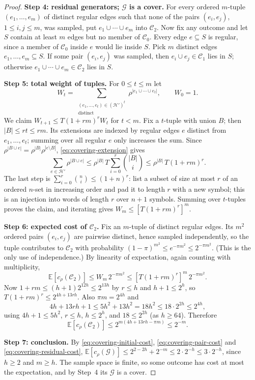 \documentclass[11pt,letterpaper]{article}
\theoremstyle{definition}
\theoremstyle{remark}
\numberwithin{equation}{section}
\newcommand{\step}[1]{\par\smallskip\noindent\textbf{#1}\enspace}
\begin{document}
\begin{proof}
\step{Step 4: residual generators; $\mathcal G$ is a cover.}
For every ordered $m$-tuple $(e_1,\ldots,e_m)$ of distinct regular edges
such that none of the pairs $(e_i,e_j)$, $1\le i,j\le m$, was sampled,
put $e_1\cup\cdots\cup e_m$ into $\mathcal C_2$. Now fix any outcome and
let $S$ contain at least $m$ edges but no member of $\mathcal C_0$.
Every edge $e\subseteq S$ is regular, since a member of $\mathcal C_0$
inside $e$ would lie inside $S$. Pick $m$ distinct edges
$e_1,\ldots,e_m\subseteq S$. If some pair $(e_i,e_j)$ was sampled, then
$e_i\cup e_j\in\mathcal C_1$ lies in $S$; otherwise
$e_1\cup\cdots\cup e_m\in\mathcal C_2$ lies in $S$.

\step{Step 5: total weight of tuples.}
For $0\le t\le m$ let
\[
W_t=
\sum_{\substack{(e_1,\ldots,e_t)\in(\mathcal H')^t\\ \text{distinct}}}
  \rho^{|e_1\cup\cdots\cup e_t|},
\qquad W_0=1.
\]
We claim $W_{t+1}\le T(1+rm)^rW_t$ for $t<m$. Fix a $t$-tuple with union
$B$; then $|B|\le rt\le rm$. Its extensions are indexed by regular edges
$e$ distinct from $e_1,\ldots,e_t$; summing over all regular $e$ only
increases the sum. Since
$\rho^{|B\cup e|}=\rho^{|B|}\rho^{|e\setminus B|}$,
\eqref{eq:covering-extension} gives
\[
\sum_{e\in\mathcal H'}\rho^{|B\cup e|}
\le\rho^{|B|}\,T\sum_{i=0}^r\binom{|B|}{i}
\le\rho^{|B|}\,T(1+rm)^r.
\]
The last step is $\sum_{i=0}^r\binom ni\le(1+n)^r$: list a subset of size
at most $r$ of an ordered $n$-set in increasing order and pad it to
length $r$ with a new symbol; this is an injection into words of length
$r$ over $n+1$ symbols. Summing over $t$-tuples proves the claim, and
iterating gives $W_m\le[T(1+rm)^r]^m$.

\step{Step 6: expected cost of $\mathcal C_2$.}
Fix an $m$-tuple of distinct regular edges. Its $m^2$ ordered pairs
$(e_i,e_j)$ are pairwise distinct, hence sampled independently, so the
tuple contributes to $\mathcal C_2$ with probability
$(1-\pi)^{m^2}\le e^{-\pi m^2}\le2^{-\pi m^2}$. (This is the only use of
independence.) By linearity of expectation, again counting with
multiplicity,
\[
\mathbb E[c_\rho(\mathcal C_2)]
\le W_m\,2^{-\pi m^2}\le[T(1+rm)^r]^m\,2^{-\pi m^2}.
\]
Now $1+rm\le(h+1)2^{12h}\le2^{13h}$ by $r\le h$ and $h+1\le2^h$, so
$T(1+rm)^r\le2^{4h+13rh}$. Also $\pi m=2^{4h}$ and
\[
4h+13rh+1\le5h^2+13h^2=18h^2\le18\cdot2^{2h}\le2^{4h},
\]
using $4h+1\le5h^2$, $r\le h$, $h\le2^h$, and $18\le2^{2h}$ (as
$h\ge64$). Therefore
\begin{equation}\label{eq:covering-residual-cost}
\mathbb E[c_\rho(\mathcal C_2)]
\le2^{m(4h+13rh-\pi m)}\le2^{-m}.
\end{equation}

\step{Step 7: conclusion.}
By \eqref{eq:covering-initial-cost}, \eqref{eq:covering-pair-cost} and
\eqref{eq:covering-residual-cost},
$\mathbb E[c_\rho(\mathcal G)]\le2^{2-2h}+2^{-m}\le2\cdot2^{-h}
\le3\cdot2^{-h}$, since $h\ge2$ and $m\ge h$. The sample space is finite,
so some outcome has cost at most the expectation, and by Step~4 its
$\mathcal G$ is a cover.
\end{proof}
\end{document}
